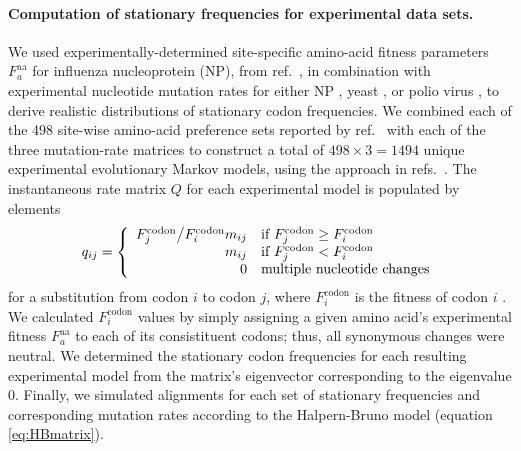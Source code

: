 \documentclass{pnastwo}
\begin{document}
\begin{article}
\paragraph{Computation of stationary frequencies for experimental data sets.}
We used experimentally-determined site-specific amino-acid fitness parameters $F^\text{aa}_a$ for influenza nucleoprotein (NP), from ref.\ \cite{Bloom2014a}, in combination with experimental nucleotide mutation rates for either NP \cite{Bloom2014a}, yeast \cite{Zhu2014}, or polio virus \cite{Acevedo2014}, to derive realistic distributions of stationary codon frequencies. We combined each of the  498 site-wise amino-acid preference sets reported by ref.\ \cite{Bloom2014a} with each of the three mutation-rate matrices to construct a total of $498 \times 3 = 1494$ unique experimental evolutionary Markov models, using the approach in refs.\ \cite{Bloom2014a,Bloom2014b}. The instantaneous rate matrix $Q$ for each experimental model is populated by elements
\begin{equation}
q_{ij} =  \left\{ 
\begin{array}{rl}
  F^\text{codon}_j \big{/} F^\text{codon}_i m_{ij} & \text{if $F^\text{codon}_j \geq F^\text{codon}_i$} \\
  m_{ij}                                           & \text{if $F^\text{codon}_j < F^\text{codon}_i$} \\ 
  0                                                & \text{multiple nucleotide changes}  \\
\end{array} \right.
\end{equation} for a substitution from codon $i$ to codon $j$, where $F^\text{codon}_i$ is the fitness of codon $i$ \cite{Bloom2014a,Bloom2014b}. We calculated $F^\text{codon}_i$ values by simply assigning a given amino acid's experimental fitness $F^\text{aa}_a$ to each of its consistituent codons; thus, all synonymous changes were neutral. We determined the stationary codon frequencies for each resulting experimental model from the matrix's eigenvector corresponding to the eigenvalue 0. Finally, we simulated alignments for each set of stationary frequencies and corresponding mutation rates according to the Halpern-Bruno model (equation \eqref{eq:HBmatrix}).   

		

\end{article}
\end{document}
